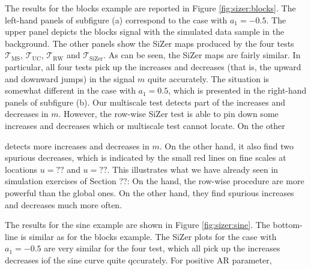 The results for the blocks example are reported in Figure \ref{fig:sizer:blocks}. The left-hand panels of subfigure (a) correspond to the case with $a_1 = -0.5$. The upper panel depicts the blocks signal with the simulated data sample in the background. The other panels show the SiZer maps produced by the four tests $\mathcal{T}_{\text{MS}}$, $\mathcal{T}_{\text{UC}}$, $\mathcal{T}_{\text{RW}}$ and $\mathcal{T}_{\text{SiZer}}$. As can be seen, the SiZer maps are fairly similar. In particular, all four tests pick up the increases and decreases (that is, the upward and downward jumps) in the signal $m$ quite accurately. The situation is somewhat different in the case with $a_1 = 0.5$, which is presented in the right-hand panels of subfigure (b). Our multiscale test detects part of the increases and decreases in $m$. However, the row-wise SiZer test is able to pin down some increases and decreases which or multiscale test cannot locate. On the other 





detects more increases and decreases in $m$. On the other hand, it also find two spurious decreases, which is indicated by the small red lines on fine scales at locations $u=??$ and $u=??$. This illustrates what we have already seen in simulation exercises of Section ??: On the hand, the row-wise procedure are more powerful than the global ones. On the other hand, they find spurious increases and decreases much more often.  


The results for the sine example are shown in Figure \ref{fig:sizer:sine}. The bottom-line is similar as for the blocks example. The SiZer plots for the case with $a_1=-0.5$ are very similar for the four test, which all pick up the increases decreases iof the sine curve quite qccurately. For positive AR parameter, 



